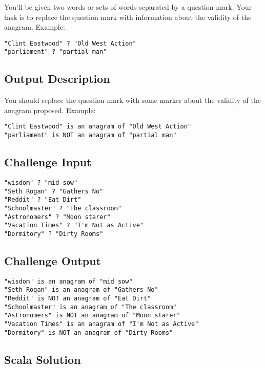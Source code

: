 You'll be given two words or sets of words separated by a question mark.
Your task is to replace the question mark with information about the
validity of the anagram. Example:

\begin{verbatim}
"Clint Eastwood" ? "Old West Action"
"parliament" ? "partial man"
\end{verbatim}

\subsection{Output Description}\label{output-description-10}

You should replace the question mark with some marker about the validity
of the anagram proposed. Example:

\begin{verbatim}
"Clint Eastwood" is an anagram of "Old West Action"
"parliament" is NOT an anagram of "partial man"
\end{verbatim}

\subsection{Challenge Input}\label{challenge-input-10}

\begin{verbatim}
"wisdom" ? "mid sow"
"Seth Rogan" ? "Gathers No"
"Reddit" ? "Eat Dirt"
"Schoolmaster" ? "The classroom"
"Astronomers" ? "Moon starer"
"Vacation Times" ? "I'm Not as Active"
"Dormitory" ? "Dirty Rooms"
\end{verbatim}

\subsection{Challenge Output}\label{challenge-output-8}

\begin{verbatim}
"wisdom" is an anagram of "mid sow"
"Seth Rogan" is an anagram of "Gathers No"
"Reddit" is NOT an anagram of "Eat Dirt"
"Schoolmaster" is an anagram of "The classroom"
"Astronomers" is NOT an anagram of "Moon starer"
"Vacation Times" is an anagram of "I'm Not as Active"
"Dormitory" is NOT an anagram of "Dirty Rooms"
\end{verbatim}

\subsection{Scala Solution}\label{scala-solution-10}

